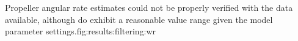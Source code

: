     \begin{subfigures}{Propeller angular rate estimates could not be properly verified with the data available, although do exhibit a reasonable value range given the model parameter settings.}{fig:results:filtering:wr}
    \end{subfigures}
